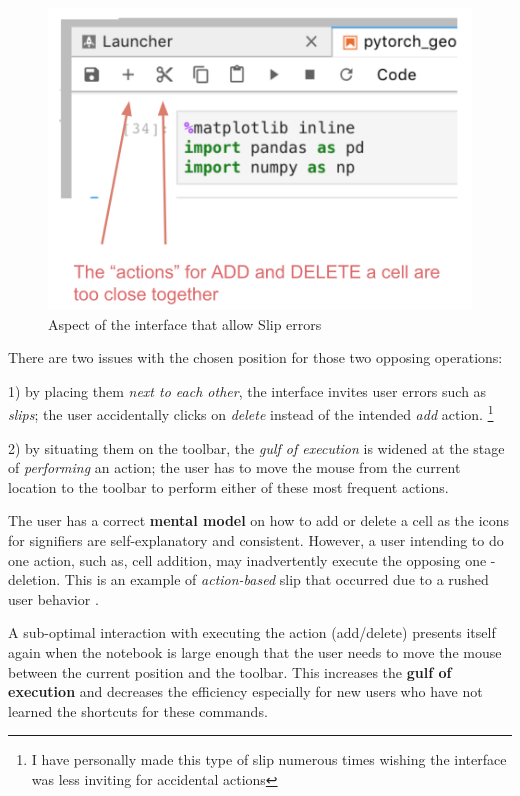 \documentclass[12pt,letterpaper]{article}
\begin{document}
\begin{figure}[hbt!]
\centering
\includegraphics[scale=.4]{figures/project-principles/jupyter_add_delete.png}
\caption{Aspect of the interface that allow Slip errors}
\label{fig::2}
\end{figure}

There are two issues with the chosen position for those two opposing operations: 

1) by placing them \textit{next to each other}, the interface invites user errors such as \textit{slips}; the user accidentally clicks on \textit{delete} instead of the intended \textit{add} action. \footnote{I have personally made this type of slip numerous times wishing the interface was less inviting for accidental actions}  

2) by situating them on the toolbar, the \textit{gulf of execution} is widened at the stage of \textit{performing} an action; the user has to move the mouse from the current location to the toolbar to perform either of these most frequent actions.

The user has a correct \textbf{mental model} on how to add or delete a cell as the icons for signifiers are self-explanatory and consistent. However, a user intending to do one action, such as, cell addition, may inadvertently execute the opposing one - deletion. This is an example of \textit{action-based} slip that occurred due to a rushed user behavior \cite{norman2013design}.

A sub-optimal interaction with executing the action (add/delete) presents itself again when the notebook is large enough that the user needs to move the mouse between the current position and the toolbar. This increases the \textbf{gulf of execution} and decreases the efficiency especially for new users who have not learned the shortcuts for these commands.  
\end{document}
